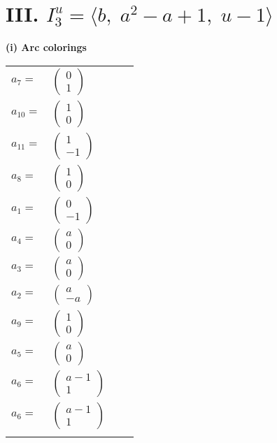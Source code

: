 \documentclass[1p]{elsarticle_modified}
\theoremstyle{definition}
\begin{document}
\centering \section*{III. $I^u_{3}= \langle b,\;a^2- a+1,\;u-1 \rangle$}
\flushleft \textbf{(i) Arc colorings}\\
\begin{tabular}{m{7pt} m{180pt} m{7pt} m{180pt} }
\flushright $a_{7}=$&$\begin{pmatrix}0\\1\end{pmatrix}$ \\
\flushright $a_{10}=$&$\begin{pmatrix}1\\0\end{pmatrix}$ \\
\flushright $a_{11}=$&$\begin{pmatrix}1\\-1\end{pmatrix}$ \\
\flushright $a_{8}=$&$\begin{pmatrix}1\\0\end{pmatrix}$ \\
\flushright $a_{1}=$&$\begin{pmatrix}0\\-1\end{pmatrix}$ \\
\flushright $a_{4}=$&$\begin{pmatrix}a\\0\end{pmatrix}$ \\
\flushright $a_{3}=$&$\begin{pmatrix}a\\0\end{pmatrix}$ \\
\flushright $a_{2}=$&$\begin{pmatrix}a\\- a\end{pmatrix}$ \\
\flushright $a_{9}=$&$\begin{pmatrix}1\\0\end{pmatrix}$ \\
\flushright $a_{5}=$&$\begin{pmatrix}a\\0\end{pmatrix}$ \\
\flushright $a_{6}=$&$\begin{pmatrix}a-1\\1\end{pmatrix}$\\ \flushright $a_{6}=$&$\begin{pmatrix}a-1\\1\end{pmatrix}$\\&\end{tabular}
\end{document}
